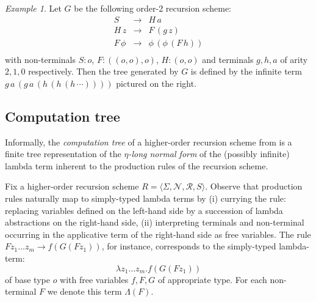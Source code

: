\documentclass[a4paper,draft]{article}[12pt]
\theoremstyle{remark}
\newtheorem{example}{Example}[section]
\theoremstyle{definition}
\begin{document}
\begin{example}\label{eg:running}
	Let $G$ be the following order-2 recursion scheme:
	\[\begin{array}{rll}
	S & \rightarrow & H \, a\\
	H \, z & \rightarrow & F \, (g \,
	z)\\
	F \, \phi & \rightarrow & \phi \, (\phi \, (F \, h))\\
	\end{array}\]
	with non-terminals $S:o$, $F : ((o, o),o)$, $H:(o,o)$ and terminals $g, h, a$ of arity $2, 1, 0$ respectively.
	Then the tree generated by $G$ is defined by the infinite term
	$g \, a \, (g \, a \, (h \, (h \, (h \,
	\cdots))))$ pictured on the right.%
	
\end{example}

\subsection{Computation tree}

Informally, the \emph{computation tree} of a higher-order recursion scheme from \cite{OngLics2006} is a finite tree representation of the \emph{$\eta$-long normal form} of the (possibly infinite) lambda term inherent to the production rules of the recursion scheme.

Fix a higher-order recursion scheme $R = \langle \Sigma, \mathcal{N}, \mathcal{R}, S \rangle$.
Observe that production rules naturally map to simply-typed lambda terms by (i) currying the rule: replacing variables defined on the left-hand side by a succession of lambda abstractions on the right-hand side, (ii) interpreting terminals and non-terminal occurring in the applicative term of the right-hand side as free variables. The rule $F z_1 \ldots z_m \rightarrow f (G (F z_1))$, for instance, corresponds to the simply-typed lambda-term:
$$\lambda z_1 \ldots z_m . f (G (F z_1))$$ of base type $o$ with free variables $f, F, G$ of appropriate type. For each non-terminal $F$ we denote this term $\Lambda(F)$.
\end{document}

